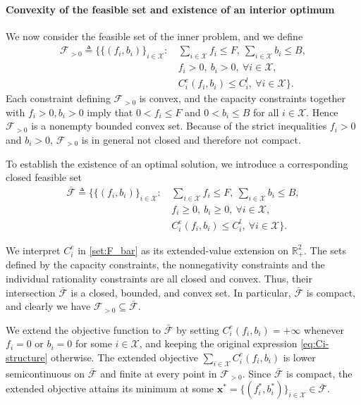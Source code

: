 \documentclass[lettersize,journal]{IEEEtran}
\begin{document}
\paragraph{Convexity of the feasible set and existence of an interior optimum}
We now consider the feasible set of the inner problem, and we define
\begin{align}
  \mathcal{F}_{>0}
  \triangleq \Big\{ \{(f_i,b_i)\}_{i\in\mathcal{X}} :\,
  & \sum_{i\in\mathcal{X}} f_i \le F,\ 
    \sum_{i\in\mathcal{X}} b_i \le B, \nonumber\\
  & f_i>0,\ b_i>0,\ \forall i\in\mathcal{X}, \nonumber\\
  & C_i^e(f_i,b_i) \le C_i^l,\ \forall i\in\mathcal{X} \Big\}.
\end{align}
Each constraint defining $\mathcal{F}_{>0}$ is convex, and the capacity constraints together with
$f_i>0,b_i>0$ imply that $0 < f_i \le F$ and $0 < b_i \le B$ for all $i\in\mathcal{X}$.
Hence $\mathcal{F}_{>0}$ is a nonempty bounded convex set. 
Because of the strict inequalities $f_i>0$ and $b_i>0$, $\mathcal{F}_{>0}$ is in general not closed
and therefore not compact.

To establish the existence of an optimal solution, we introduce a corresponding closed feasible set
\begin{align}\label{set:F_bar}
  \bar{\mathcal{F}}
  \triangleq \Big\{ \{(f_i,b_i)\}_{i\in\mathcal{X}} :\,
  & \sum_{i\in\mathcal{X}} f_i \le F,\ 
    \sum_{i\in\mathcal{X}} b_i \le B, \nonumber\\
  & f_i\ge 0,\ b_i\ge 0,\ \forall i\in\mathcal{X}, \nonumber\\
  & C_i^e(f_i,b_i) \le C_i^l,\ \forall i\in\mathcal{X} \Big\}.
\end{align}

We interpret $C^e_i$ in \eqref{set:F_bar} as its extended-value extension on $\mathbb{R}^2_+$.
The sets defined by the capacity constraints, the nonnegativity constraints and the individual rationality
constraints are all closed and convex. Thus, their intersection $\bar{\mathcal{F}}$ is a closed,
bounded, and convex set. In particular, $\bar{\mathcal{F}}$ is compact, and clearly we have
$\mathcal{F}_{>0} \subseteq \bar{\mathcal{F}}$.

We extend the objective function to $\bar{\mathcal{F}}$ by setting
$C_i^e(f_i,b_i) = +\infty$ whenever $f_i=0$ or $b_i=0$ for some $i\in\mathcal{X}$, and keeping the
original expression \eqref{eq:Ci-structure} otherwise.
The extended objective $\sum_{i\in\mathcal{X}} C_i^e(f_i,b_i)$ is lower semicontinuous on
$\bar{\mathcal{F}}$ and finite at every point in $\mathcal{F}_{>0}$.
Since $\bar{\mathcal{F}}$ is compact, the extended objective attains its minimum at some
$\mathbf{x}^* = \{(f_i^*,b_i^*)\}_{i\in\mathcal{X}} \in \bar{\mathcal{F}}$.
\end{document}
